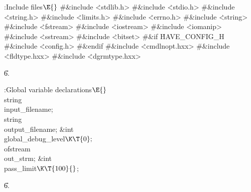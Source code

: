 






















































\Y\B\4:Include files\X${}\E{}$\6
\8\#\&{include} \.{<stdlib.h>}\6
\8\#\&{include} \.{<stdio.h>}\6
\8\#\&{include} \.{<string.h>}\6
\8\#\&{include} \.{<limits.h>}\6
\8\#\&{include} \.{<errno.h>}\6
\8\#\&{include} \.{<string>}\6
\8\#\&{include} \.{<fstream>}\6
\8\#\&{include} \.{<iostream>}\6
\8\#\&{include} \.{<iomanip>}\6
\8\#\&{include} \.{<sstream>}\6
\8\#\&{include} \.{<bitset>}\6
\8\#\&{if} \.{HAVE\_CONFIG\_H}\6
\8\#\&{include} \.{<config.h>}\6
\8\#\&{endif}\6
\8\#\&{include} \.{<cmdlnopt.hxx>}\6
\8\#\&{include} \.{<fldtype.hxx>}\6
\8\#\&{include} \.{<dgrmtype.hxx>}\par
\U6.\fi

\Y\B\4:Global variable declarations\X${}\E{}$\6
\\{string}\\{input\_filename};\6
\\{string}\\{output\_filename};\7
\&{int} \\{global\_debug\_level}${}\K\T{0};{}$\7
\\{ofstream}\\{out\_strm};\7
\&{int} \\{pass\_limit}${}\K\T{100}{}$;\par
\U6.\fi

